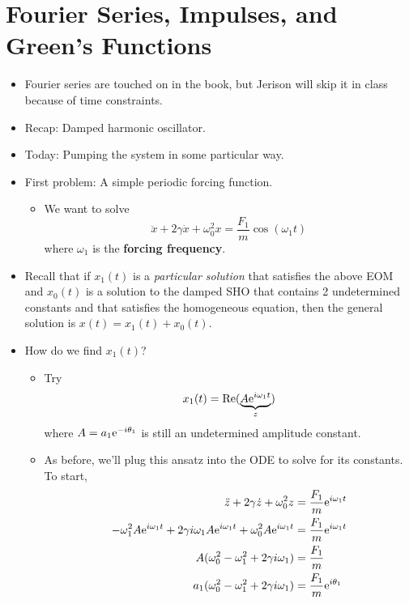 \documentclass[../notes.tex]{subfiles}
\begin{document}
\section{Fourier Series, Impulses, and Green's Functions}
\begin{itemize}
    \item {}Fourier series are touched on in the book, but Jerison will skip it in class because of time constraints.
    \item Recap: Damped harmonic oscillator.
    \item Today: Pumping the system in some particular way.
    \item First problem: A simple periodic forcing function.
    \begin{itemize}
        \item We want to solve
        \begin{equation*}
            \ddot{x}+2\gamma\dot{x}+\omega_0^2x = \frac{F_1}{m}\cos(\omega_1t)
        \end{equation*}
        where $\omega_1$ is the \textbf{forcing frequency}.
    \end{itemize}
    \item Recall that if $x_1(t)$ is a \emph{particular solution} that satisfies the above EOM and $x_0(t)$ is a solution to the damped SHO that contains 2 undetermined constants and that satisfies the homogeneous equation, then the general solution is $x(t)=x_1(t)+x_0(t)$.
    \item How do we find $x_1(t)$?
    \begin{itemize}
        \item Try
        \begin{equation*}
            x_1(t) = \re(\underbrace{A\e[i\omega_1t]}_z)
        \end{equation*}
        where $A=a_1\e[-i\theta_1]$ is still an undetermined amplitude constant.
        \item As before, we'll plug this ansatz into the ODE to solve for its constants. To start,
        \begin{align*}
            \ddot{z}+2\gamma\dot{z}+\omega_0^2z &= \frac{F_1}{m}\e[i\omega_1t]\\
            -\omega_1^2A\e[i\omega_1t]+2\gamma i\omega_1A\e[i\omega_1t]+\omega_0^2A\e[i\omega_1t] &= \frac{F_1}{m}\e[i\omega_1t]\\
            A(\omega_0^2-\omega_1^2+2\gamma i\omega_1) &= \frac{F_1}{m}\\
            a_1(\omega_0^2-\omega_1^2+2\gamma i\omega_1) &= \frac{F_1}{m}\e[i\theta_1]\\

\end{align*}
\end{itemize}
\end{itemize}
\end{document}
